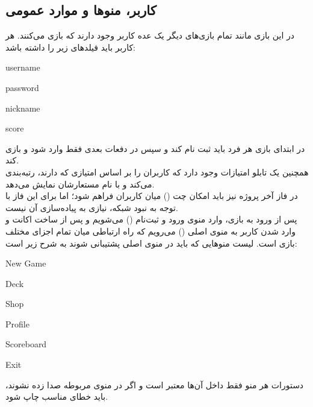\documentclass[]{article}
\begin{document}
\subsection*{{\titr کاربر، منوها و موارد عمومی}}

در این بازی مانند تمام بازی‌های دیگر یک عده کاربر وجود دارند که بازی می‌کنند. 
هر کاربر باید فیلد‌های زیر را داشته باشد:
\begin{itemize}[label=$\blacksquare$]
	\begin{latin}
		\item username
		\item password
		\item nickname
		\item score
	\end{latin}
\end{itemize}
در ابتدای بازی هر فرد باید ثبت نام کند و سپس در دفعات بعدی فقط وارد شود و 
بازی کند.
\\
همچنین یک تابلو امتیازات وجود دارد که کاربران را بر اساس امتیازی که دارند، 
رتبه‌بندی می‌کند و با نام مستعارشان نمایش می‌دهد.
\\
در فاز‌ آخر پروژه نیز باید امکان چت () میان کاربران فراهم 
شود؛ اما برای این فاز با توجه به نبود شبکه، نیازی به پیاده‌سازی آن نیست.
\\
پس از ورود به بازی، وارد منوی ورود و ثبت‌نام () می‌شویم و پس از 
ساخت اکانت و وارد شدن کاربر به منوی اصلی () می‌رویم که راه 
ارتباطی میان تمام اجزای مختلف بازی است. لیست منو‌هایی که باید در منوی اصلی 
پشتیبانی شوند به شرح زیر است:

\begin{itemize}[label=$\blacksquare$]
	\begin{latin}
		\item New Game
		\item Deck
		\item Shop
		\item Profile
		\item Scoreboard
		\item Exit
	\end{latin}
\end{itemize}
دستورات هر منو فقط داخل آن‌ها معتبر است و اگر در منوی مربوطه صدا زده نشوند، 
باید خطای مناسب چاپ شود.
\end{document}
